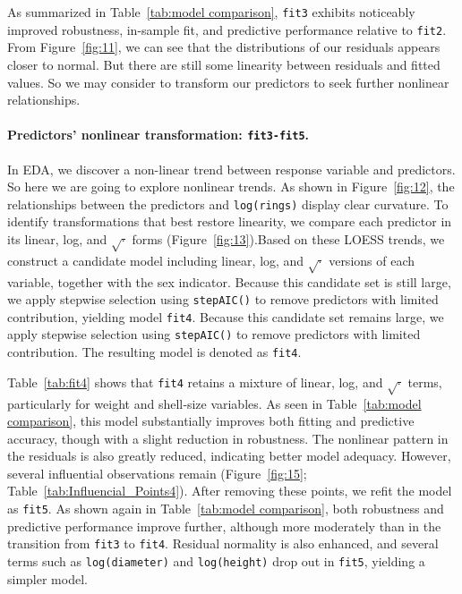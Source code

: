 \documentclass[12pt]{article}
\begin{document}
	As summarized in Table~\ref{tab:model comparison}, \texttt{fit3} exhibits noticeably improved robustness, in-sample fit, and predictive performance relative to \texttt{fit2}. From Figure~\ref{fig:11}, we can see that the distributions of our residuals appears closer to normal. But there are still some linearity between residuals and fitted values. So we may consider to transform our predictors to seek further nonlinear relationships. 
	
	\paragraph{Predictors' nonlinear transformation: \texttt{fit3-fit5}.} In EDA, we discover a non-linear trend between response variable and predictors. So here we are going to explore nonlinear trends. As shown in Figure~\ref{fig:12}, the relationships between the predictors and \texttt{log(rings)} display clear curvature. To identify transformations that best restore linearity, we compare each predictor in its linear, log, and $\sqrt{\cdot}$ forms (Figure~\ref{fig:13}).Based on these LOESS trends, we construct a candidate model including linear, log, and $\sqrt{\cdot}$ versions of each variable, together with the sex indicator. Because this candidate set is still large, we apply stepwise selection using \texttt{stepAIC()} to remove predictors with limited contribution, yielding model \texttt{fit4}. Because this candidate set remains large, we apply stepwise selection using \texttt{stepAIC()} to remove predictors with limited contribution. The resulting model is denoted as \texttt{fit4}.
	
	Table~\ref{tab:fit4} shows that \texttt{fit4} retains a mixture of linear, log, and $\sqrt{\cdot}$ terms, particularly for weight and shell‐size variables. As seen in Table~\ref{tab:model comparison}, this model substantially improves both fitting and predictive accuracy, though with a slight reduction in robustness. The nonlinear pattern in the residuals is also greatly reduced, indicating better model adequacy. However, several influential observations remain (Figure~\ref{fig:15}; Table~\ref{tab:Influencial_Points4}). After removing these points, we refit the model as \texttt{fit5}. As shown again in Table~\ref{tab:model comparison}, both robustness and predictive performance improve further, although more moderately than in the transition from \texttt{fit3} to \texttt{fit4}. Residual normality is also enhanced, and several terms such as \texttt{log(diameter)} and \texttt{log(height)} drop out in \texttt{fit5}, yielding a simpler model.
	
\end{document}
